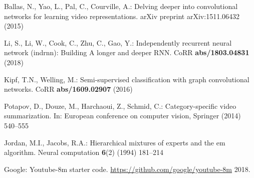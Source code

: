 \documentclass[runningheads]{llncs}
\begin{document}
\begin{thebibliography}{10}
Ballas, N., Yao, L., Pal, C., Courville, A.:
\newblock Delving deeper into convolutional networks for learning video
  representations.
\newblock arXiv preprint arXiv:1511.06432 (2015)

Li, S., Li, W., Cook, C., Zhu, C., Gao, Y.:
\newblock Independently recurrent neural network (indrnn): Building {A} longer
  and deeper {RNN}.
\newblock CoRR \textbf{abs/1803.04831} (2018)

Kipf, T.N., Welling, M.:
\newblock Semi-supervised classification with graph convolutional networks.
\newblock CoRR \textbf{abs/1609.02907} (2016)

Potapov, D., Douze, M., Harchaoui, Z., Schmid, C.:
\newblock Category-specific video summarization.
\newblock In: European conference on computer vision, Springer (2014)  540--555

Jordan, M.I., Jacobs, R.A.:
\newblock Hierarchical mixtures of experts and the em algorithm.
\newblock Neural computation \textbf{6}(2) (1994)  181--214

Google:
\newblock Youtube-8m starter code.
\newblock \url{https://github.com/google/youtube-8m} 2018.

\end{thebibliography}
\end{document}
